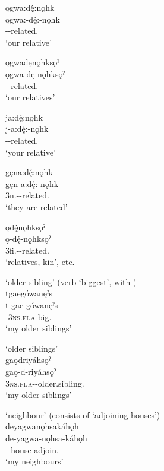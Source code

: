 \ex ǫgwa:dę́:nǫhk\\
\gll ǫgwa:-dę́:-nǫhk\\
 -{\semireflexive}-related.{\stative}\\
\glt `our relative'

\ex ǫgwadęnǫhksǫˀ\\
\gll ǫgwa-dę-nǫhksǫˀ\\
 -{\semireflexive}-related.{\pluralizer}	\\
\glt `our relatives'

\ex ja:dę́:nǫhk\\
\gll j-a:dę́:-nǫhk\\
 -{\semireflexive}-related.{\stative}\\
\glt `your relative'

\ex gęna:dę́:nǫhk\\
\gll gęn-a:dę́:-nǫhk\\
{3n.\sga}-{\semireflexive}-related.{\stative}\\
\glt ‘they are related’

\ex ǫdę́nǫ̱hksǫˀ\\
\gll ǫ-dę́-nǫ̱hksǫˀ\\
{3fi.\sga}-{\semireflexive}-related.{\pluralizer}\\
\glt ‘relatives, kin’, etc.
\z
\z

\ea\label{ex:kintermppex5}  ‘older sibling’ (verb  ‘biggest’, with  {\plural})\\
tgaegówanęˀs\\
\gll t-gae-gówanęˀs\\
 {\cislocative}-\textsc{3ns.fi.a}-big.\plural\\
\glt `my older siblings'
\z

\newpage
\ea\label{ex:kintermppex6}  ‘older siblings’\\
gaǫdriyáhsǫˀ\\
\gll gaǫ-d-riyáhsǫˀ\\
 \textsc{3ns.fi.a}-{\semireflexive}-older.sibling.{\pluralizer}\\
\glt `my older siblings'
\z


\ea\label{ex:kintermppex3}  ‘neighbour’ (consists of  ‘adjoining houses’)\\
deyagwanǫhsakáhǫh\\
\gll de-yagwa-nǫhsa-káhǫh\\
 {\dualic}--house-adjoin.{\stative}\\
\glt `my neighbours'
\z


